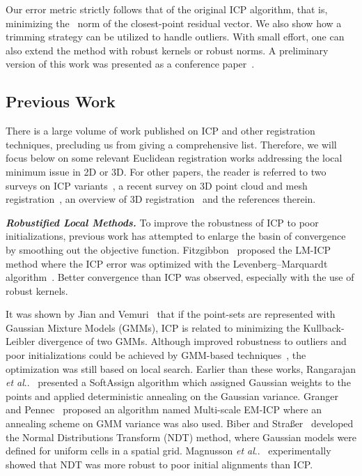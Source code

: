 \documentclass[10pt,journal,cspaper,compsoc]{IEEEtran}
\makeatletter
\DeclareRobustCommand\onedot{\futurelet\@let@token\@onedot}
\def\@onedot{\ifx\@let@token.\else.\null\fi\xspace}
\def\etal{\emph{et al}\onedot}
\makeatother
\begin{document}
Our error metric strictly follows that of the original ICP algorithm, that is, minimizing the ~norm of the closest-point residual vector. We also show how a trimming strategy can be utilized to handle outliers. With small effort, one can also extend the method with robust kernels or robust norms. A preliminary version of this work was presented as a conference paper~\cite{yang2013goicp}.

\subsection{Previous Work}
There is a large volume of work published on ICP and other registration techniques, precluding us from giving a comprehensive list. Therefore, we will focus below on some relevant Euclidean registration works addressing the local minimum issue in 2D or 3D. For other papers, the reader is referred to two surveys on ICP variants~\cite{rusinkiewicz2001efficient,pomerleau2013comparing}, a recent survey on 3D point cloud and mesh registration~\cite{tam2013registration}, an overview of 3D registration~\cite{castellani20123d} and the references therein.

\vspace{4pt}
\noindent\textbf{\emph{{Robustified Local Methods.}}} To improve the robustness of ICP to poor initializations, previous work has attempted to enlarge the basin of convergence by smoothing out the objective function. Fitzgibbon~\cite{fitzgibbon2003robust} proposed the LM-ICP method where the ICP error was optimized with the Levenberg--Marquardt algorithm~\cite{more1978levenberg}. Better convergence than ICP was observed, especially with the use of robust kernels.

It was shown by Jian and Vemuri~\cite{jian2005robust} that if the point-sets are represented with Gaussian Mixture Models (GMMs), ICP is related to minimizing the Kullback-Leibler divergence of two GMMs. Although improved robustness to outliers and poor initializations could be achieved by GMM-based techniques~\cite{jian2005robust,tsin2004correlation,myronenko2010point,campbell2015adaptive}, the optimization was still based on local search. Earlier than these works, Rangarajan \etal~\cite{rangarajan1997robust} presented a SoftAssign algorithm which assigned Gaussian weights to the points and applied deterministic annealing on the Gaussian variance. Granger and Pennec~\cite{granger2002multi} proposed an algorithm named Multi-scale EM-ICP where an annealing scheme on GMM variance was also used. Biber and Stra{\ss}er~\cite{biber2003normal} developed the Normal Distributions Transform (NDT) method, where Gaussian models were defined for uniform cells in a spatial grid. Magnusson \etal~\cite{magnusson2009evaluation} experimentally showed that NDT was more robust to poor initial alignments than ICP.
\end{document}
